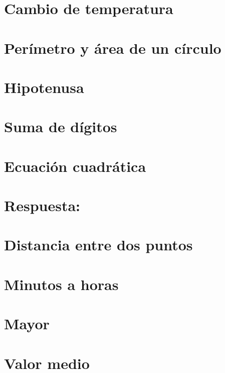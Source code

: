 \section{Cambio de temperatura}


\section{Perímetro y área de un círculo}


\section{Hipotenusa}


\section{Suma de dígitos}


\section{Ecuación cuadrática}

\ifshowanswers
\section*{Respuesta:}

\fi

\section{Distancia entre dos puntos}


\section{Minutos a horas}


\section{Mayor}


\section{Valor medio}

    
